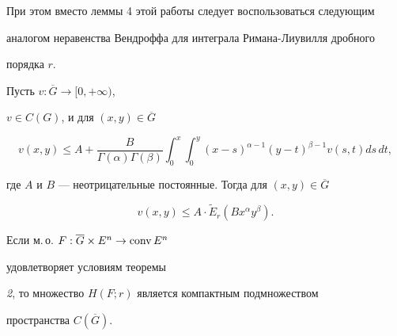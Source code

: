 При этом вместо леммы 4 этой работы следует воспользоваться следующим 


аналогом неравенства Вендроффа для интеграла Римана-Лиувилля дробного 


порядка $r$. 


 


\begin{lem} Пусть $v:\overline G\to[0,+\infty)$, 


$v\in C(G)$, и для $(x,y)\in\overline G$ 


$$ 


v(x,y)\le A+\frac{B}{\Gamma(\alpha)\Gamma(\beta)} 


\int^x_0\int^y_0 (x-s)^{\alpha-1}(y-t)^{\beta-1} 


v(s,t)ds\,dt, 


$$ 


где $A$ и $B$ --- неотрицательные постоянные. Тогда для $(x,y)\in\overline G$ 


$$ 


v(x,y)\le A\cdot\widetilde E_r(Bx^\alpha y^\beta). 


$$ 


\end{lem} 


 


\begin{thm} Если м.\,о. $F:\overline G\times E^n\to\operatorname{conv} E^n$ 


удовлетворяет условиям теоремы 


{\em 2}, то множество $H(F;r)$ является компактным подмножеством 


пространства $C(\overline G)$. 


\end{thm} 


 


